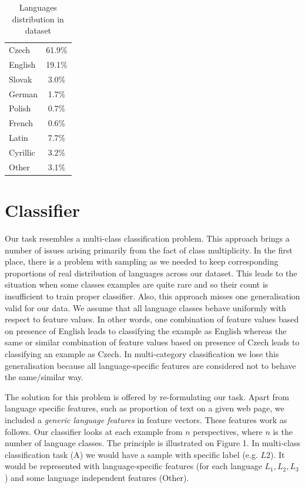 \documentclass{acm_proc_article-sp}
\begin{document}
  \begin{table}[]
 \centering
 \caption{Languages distribution in dataset} 
 \label{langdist} 
 \vspace{0.5cm}
 \begin{tabular}{l||c}
    Czech & 61.9\% \\
    English & 19.1\% \\
    Slovak & 3.0\% \\
    German & 1.7\% \\
    Polish & 0.7\% \\
    French & 0.6\% \\ \hline
    Latin & 7.7\% \\
    Cyrillic & 3.2\% \\
    Other & 3.1\% \\
 \end{tabular}
 \end{table}


  \section{Classifier}

  Our task resembles a multi-class classification problem. 
  This approach brings a number of issues arising primarily from the fact of class multiplicity. 
  In the first place, there is a problem with sampling as we needed to keep corresponding proportions 
  of real distribution of languages across our dataset. 
  This leads to the situation when some classes examples are quite rare and so their count is insufficient 
  to train proper classifier. Also, this approach misses one generalisation valid for our data.
  We assume that all language classes behave uniformly with respect to feature values. In other words, 
  one combination of feature values based on presence of English leads to classifying the example as English whereas 
  the same or similar combination of feature values based on presence of Czech leads to classifying an example as Czech.
  In multi-category classification we lose this generalisation because all language-specific features are considered
  not to behave the same/similar way.

  The solution for this problem is offered by re-formulating our task.
  Apart from language specific features, such as proportion of text on a given 
  web page, we included a \textit{generic language features} in feature vectors. These features work as follows.
  Our classifier looks at each example from $n$ perspectives, where $n$ is the number of language classes.
  The principle is illustrated on Figure 1. 
  In multi-class classification task (A) we would have a sample with specific label (e.g. $L2$).
  It would be represented with language-specific features (for each language $L_1,L_2,L_3$ ) and some 
  language independent features (Other).
\end{document}

